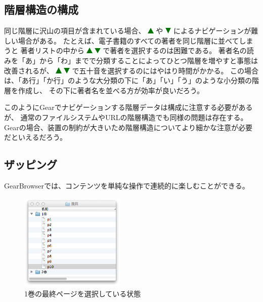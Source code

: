 \documentclass[twoside]{wiss}
\def\GEAR{\textsf{Gear}}
\def\GB{\textsf{GearBrowser}}
\def\figwidth{50mm}
\def\up{ \includegraphics[width=3mm,bb=0 0 36 36]{figures/uptriangle.pdf} }
\def\down{ \includegraphics[width=3mm,bb=0 0 36 36]{figures/downtriangle.pdf} }
\begin{document}
\subsection{階層構造の構成}

同じ階層に沢山の項目が含まれている場合、
{\up}や{\down}によるナビゲーションが難しい場合がある。
たとえば、電子書籍のすべての著者を同じ階層に並べてしまうと
著者リストの中から{\up}{\down}で著者を選択するのは困難である。
著者名の読みを「あ」から「わ」までで分類することによってひとつ階層を増やすと事態は改善されるが、
{\up}{\down}で五十音を選択するのにはやはり時間がかかる。
この場合は、「あ行」「か行」のような大分類の下に「あ」「い」「う」のような小分類の階層を作成し、
その下に著者名を並べる方が効率が良いだろう。

このように{\GEAR}でナビゲーションする階層データは構成に注意する必要があるが、
通常のファイルシステムやURLの階層構造でも同様の問題は存在する。
{\GEAR}の場合、装置の制約が大きいため階層構造についてより細かな注意が必要だといえるだろう。

\subsection{ザッピング}


{\GB}では、コンテンツを単純な操作で連続的に楽しむことができる。

\begin{figure}[H]
\centerline{\includegraphics[width=\figwidth,bb=0 0 344 318]{figures/9a8615b0242c9ba4deb77ca30ab94d7c.png}}
\caption{1巻の最終ページを選択している状態}
\label{manga1}
\end{figure}
\end{document}
